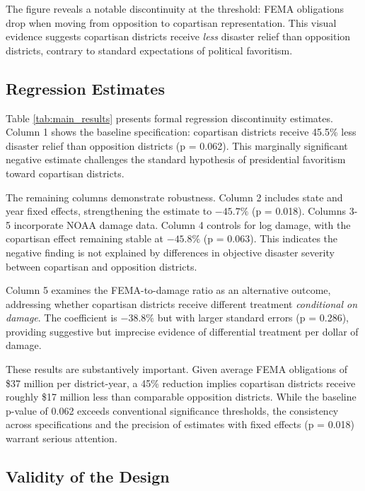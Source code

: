 \documentclass[12pt,letterpaper,oneside]{book}
\newcommand{\basepath}{g:/My Drive/Grad School}
\newcommand{\basepath}{basepath}
\begin{document}
The figure reveals a notable discontinuity at the threshold: FEMA obligations drop when moving from opposition to copartisan representation. This visual evidence suggests copartisan districts receive \emph{less} disaster relief than opposition districts, contrary to standard expectations of political favoritism.

\subsection{Regression Estimates}

Table \ref{tab:main_results} presents formal regression discontinuity estimates. Column 1 shows the baseline specification: copartisan districts receive 45.5\% less disaster relief than opposition districts (p = 0.062). This marginally significant negative estimate challenges the standard hypothesis of presidential favoritism toward copartisan districts.



The remaining columns demonstrate robustness. Column 2 includes state and year fixed effects, strengthening the estimate to $-45.7\%$ (p = 0.018). Columns 3-5 incorporate NOAA damage data. Column 4 controls for log damage, with the copartisan effect remaining stable at $-45.8\%$ (p = 0.063). This indicates the negative finding is not explained by differences in objective disaster severity between copartisan and opposition districts.

Column 5 examines the FEMA-to-damage ratio as an alternative outcome, addressing whether copartisan districts receive different treatment \emph{conditional on damage}. The coefficient is $-38.8\%$ but with larger standard errors (p = 0.286), providing suggestive but imprecise evidence of differential treatment per dollar of damage.

These results are substantively important. Given average FEMA obligations of \$37 million per district-year, a 45\% reduction implies copartisan districts receive roughly \$17 million less than comparable opposition districts. While the baseline p-value of 0.062 exceeds conventional significance thresholds, the consistency across specifications and the precision of estimates with fixed effects (p = 0.018) warrant serious attention.

\subsection{Validity of the Design}
\end{document}
